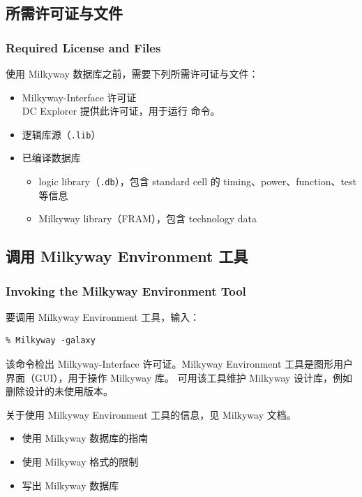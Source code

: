\subsection{所需许可证与文件}
\subsubsection*{Required License and Files}

使用 Milkyway 数据库之前，需要下列所需许可证与文件：
\begin{itemize}
  \item Milkyway-Interface 许可证\\
        DC Explorer 提供此许可证，用于运行  命令。
  \item 逻辑库源（\texttt{.lib}）
  \item 已编译数据库
  \begin{itemize}
    \item logic library（\texttt{.db}），包含 standard cell 的 timing、power、function、test 等信息
    \item Milkyway library（FRAM），包含 technology data
  \end{itemize}
\end{itemize}

\subsection{调用 Milkyway Environment 工具}
\subsubsection*{Invoking the Milkyway Environment Tool}

要调用 Milkyway Environment 工具，输入：
\begin{lstlisting}
% Milkyway -galaxy
\end{lstlisting}

该命令检出 Milkyway-Interface 许可证。Milkyway Environment 工具是图形用户界面（GUI），用于操作 Milkyway 库。
可用该工具维护 Milkyway 设计库，例如删除设计的未使用版本。

关于使用 Milkyway Environment 工具的信息，见 Milkyway 文档。

\begin{seeAlsoBox}
\begin{itemize}
  \item 使用 Milkyway 数据库的指南
  \item 使用 Milkyway 格式的限制
  \item 写出 Milkyway 数据库
\end{itemize}
\end{seeAlsoBox}

